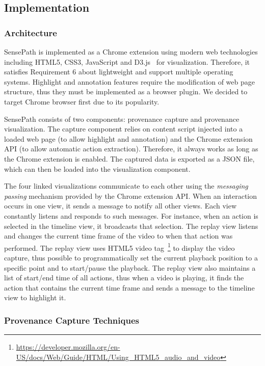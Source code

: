 \subsection{Implementation}

\subsubsection{Architecture}
SensePath is implemented as a Chrome extension using modern web technologies including HTML5, CSS3, JavaScript and D3.js~\cite{Bostock2011} for visualization. Therefore, it satisfies Requirement 6 about lightweight and support multiple operating systems. Highlight and annotation features require the modification of web page structure, thus they must be implemented as a browser plugin. We decided to target Chrome browser first due to its popularity.

SensePath consists of two components: provenance capture and provenance visualization. The capture component relies on content script injected into a loaded web page (to allow highlight and annotation) and the Chrome extension API (to allow automatic action extraction). Therefore, it always works as long as the Chrome extension is enabled. The captured data is exported as a JSON file, which can then be loaded into the visualization component.

The four linked visualizations communicate to each other using the \textit{messaging passing} mechanism provided by the Chrome extension API. When an interaction occurs in one view, it sends a message to notify all other views. Each view constantly listens and responds to such messages. For instance, when an action is selected in the timeline view, it broadcasts that selection. The replay view listens and changes the current time frame of the video to when that action was performed. The replay view uses HTML5 video tag~\footnote{\url{https://developer.mozilla.org/en-US/docs/Web/Guide/HTML/Using_HTML5_audio_and_video}} to display the video capture, thus possible to programmatically set the current playback position to a specific point and to start/pause the playback. The replay view also maintains a list of start/end time of all actions, thus when a video is playing, it finds the action that contains the current time frame and sends a message to the timeline view to highlight it.

\subsubsection{Provenance Capture Techniques}


